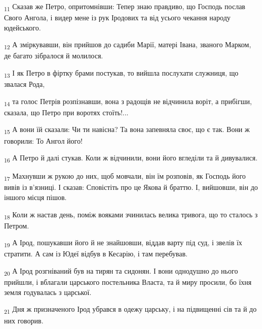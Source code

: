 \begin{tcolorbox}
\textsubscript{11} Сказав же Петро, опритомнівши: Тепер знаю правдиво, що Господь послав Свого Ангола, і видер мене із рук Іродових та від усього чекання народу юдейського.
\end{tcolorbox}
\begin{tcolorbox}
\textsubscript{12} А зміркувавши, він прийшов до садиби Марії, матері Івана, званого Марком, де багато зібралося й молилося.
\end{tcolorbox}
\begin{tcolorbox}
\textsubscript{13} І як Петро в фіртку брами постукав, то вийшла послухати служниця, що звалася Рода,
\end{tcolorbox}
\begin{tcolorbox}
\textsubscript{14} та голос Петрів розпізнавши, вона з радощів не відчинила воріт, а прибігши, сказала, що Петро при воротях стоїть!...
\end{tcolorbox}
\begin{tcolorbox}
\textsubscript{15} А вони їй сказали: Чи ти навісна? Та вона запевняла своє, що є так. Вони ж говорили: То Ангол його!
\end{tcolorbox}
\begin{tcolorbox}
\textsubscript{16} А Петро й далі стукав. Коли ж відчинили, вони його вгледіли та й дивувалися.
\end{tcolorbox}
\begin{tcolorbox}
\textsubscript{17} Махнувши ж рукою до них, щоб мовчали, він їм розповів, як Господь його вивів із в'язниці. І сказав: Сповістіть про це Якова й браттю. І, вийшовши, він до іншого місця пішов.
\end{tcolorbox}
\begin{tcolorbox}
\textsubscript{18} Коли ж настав день, поміж вояками зчинилась велика тривога, що то сталось з Петром.
\end{tcolorbox}
\begin{tcolorbox}
\textsubscript{19} А Ірод, пошукавши його й не знайшовши, віддав варту під суд, і звелів їх стратити. А сам із Юдеї відбув в Кесарію, і там перебував.
\end{tcolorbox}
\begin{tcolorbox}
\textsubscript{20} А Ірод розгніваний був на тирян та сидонян. І вони однодушно до нього прийшли, і вблагали царського постельника Власта, та й миру просили, бо їхня земля годувалась з царської.
\end{tcolorbox}
\begin{tcolorbox}
\textsubscript{21} Дня ж призначеного Ірод убрався в одежу царську, і на підвищенні сів та й до них говорив.
\end{tcolorbox}
